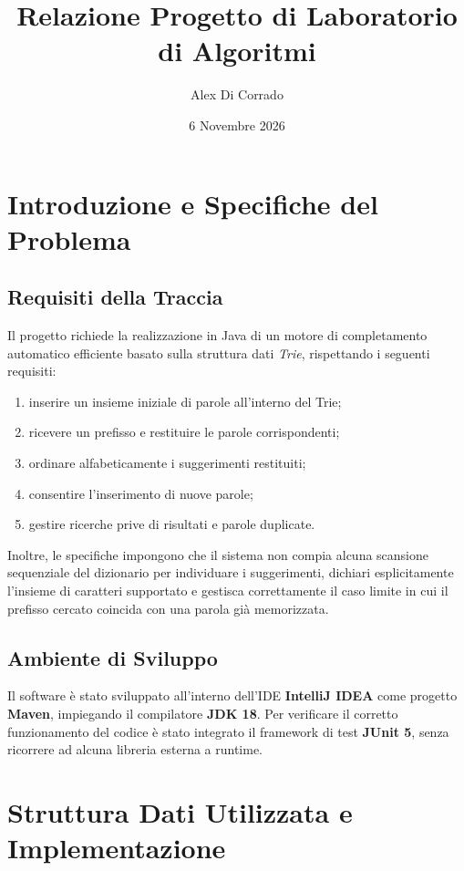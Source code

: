 \documentclass[11pt,a4paper]{article}
\title{Relazione Progetto di Laboratorio di Algoritmi}
\author{Alex Di Corrado}
\date{6 Novembre 2026}
\begin{document}
\maketitle
\tableofcontents
\clearpage


\section{Introduzione e Specifiche del Problema}

\subsection{Requisiti della Traccia}
Il progetto richiede la realizzazione in Java di un motore di completamento automatico efficiente basato sulla struttura dati \emph{Trie}, rispettando i seguenti requisiti:
\begin{enumerate}
    \item inserire un insieme iniziale di parole all'interno del Trie;
    \item ricevere un prefisso e restituire le parole corrispondenti;
    \item ordinare alfabeticamente i suggerimenti restituiti;
    \item consentire l'inserimento di nuove parole;
    \item gestire ricerche prive di risultati e parole duplicate.
\end{enumerate}
Inoltre, le specifiche impongono che il sistema non compia alcuna scansione sequenziale del dizionario per individuare i suggerimenti, dichiari esplicitamente l'insieme di caratteri supportato e gestisca correttamente il caso limite in cui il prefisso cercato coincida con una parola già memorizzata.

\subsection{Ambiente di Sviluppo}
Il software è stato sviluppato all'interno dell'IDE \textbf{IntelliJ IDEA} come progetto \textbf{Maven}, impiegando il compilatore \textbf{JDK 18}. Per verificare il corretto funzionamento del codice è stato integrato il framework di test \textbf{JUnit 5}, senza ricorrere ad alcuna libreria esterna a runtime.


\section{Struttura Dati Utilizzata e Implementazione}
\end{document}
